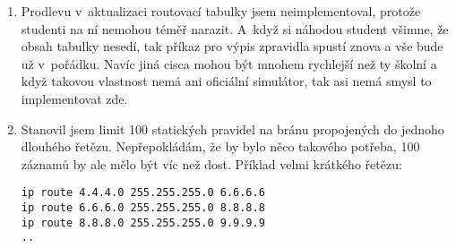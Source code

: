 \begin{enumerate}
 \item Prodlevu v~aktualizaci routovací tabulky jsem neimplementoval, protože studenti na ní nemohou téměř narazit. A~když si náhodou student všimne, že obsah tabulky nesedí, tak příkaz pro výpis zpravidla spustí znova a vše bude už v~pořádku. Navíc jiná cisca mohou být mnohem rychlejší než ty školní a když takovou vlastnost nemá ani oficiální simulátor, tak asi nemá smysl to implementovat zde.

 \item Stanovil jsem limit 100 statických pravidel na bránu propojených do jednoho dlouhého řetězu. Nepřepokládám, že by bylo něco takového potřeba, 100 záznamů by ale mělo být víc než dost. Příklad velmi krátkého řetězu:
\begin{verbatim}
ip route 4.4.4.0 255.255.255.0 6.6.6.6
ip route 6.6.6.0 255.255.255.0 8.8.8.8
ip route 8.8.8.0 255.255.255.0 9.9.9.9
..
\end{verbatim} 


\end{enumerate}



